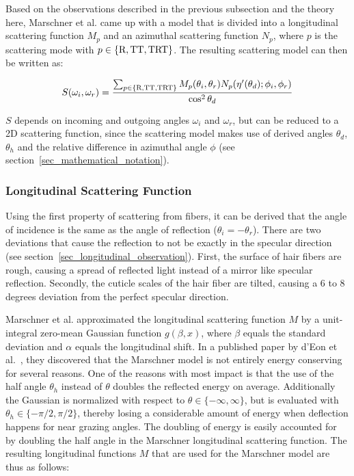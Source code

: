 \documentclass[11pt,a4paper]{report}
\begin{document}
Based on the observations described in the previous subsection and the theory here, Marschner et al. came up with a model that is divided into a longitudinal scattering function $M_p$ and an azimuthal scattering function $N_p$, where $p$ is the scattering mode with $p \in \{\textnormal{R}, \textnormal{TT}, \textnormal{TRT}\}$. The resulting scattering model can then be written as:

\begin{equation}
\label{marschner_model_scatterfunction}
S(\omega_i, \omega_r) = \frac{\sum_{p \in \{\textnormal{R}, \textnormal{TT}, \textnormal{TRT}\}} M_p(\theta_i, \theta_r) N_p(\eta'(\theta_d); \phi_i, \phi_r)}{\cos^2 \theta_d}
\end{equation}

$S$ depends on incoming and outgoing angles $\omega_i$ and $\omega_r$, but can be reduced to a 2D scattering function, since the scattering model makes use of derived angles $\theta_d$, $\theta_h$ and the relative difference in azimuthal angle $\phi$ (see section~\ref{sec_mathematical_notation}).

\subsubsection{Longitudinal Scattering Function}
\label{marschner_longitudinal_scattering_function}

Using the first property of scattering from fibers, it can be derived that the angle of incidence is the same as the angle of reflection ($\theta_i = -\theta_r$). There are two deviations that cause the reflection to not be exactly in the specular direction (see section~\ref{sec_longitudinal_observation}). First, the surface of hair fibers are rough, causing a spread of reflected light instead of a mirror like specular reflection. Secondly, the cuticle scales of the hair fiber are tilted, causing a 6 to 8 degrees deviation from the perfect specular direction.

Marschner et al. approximated the longitudinal scattering function $M$ by a unit-integral zero-mean Gaussian function $g(\beta, x)$, where $\beta$ equals the standard deviation and $\alpha$ equals the longitudinal shift. In a published paper by d'Eon et al.~\cite{eon2011}, they discovered that the Marschner model is not entirely energy conserving for several reasons. One of the reasons with most impact is that the use of the half angle $\theta_h$ instead of $\theta$ doubles the reflected energy on average. Additionally the Gaussian is normalized with respect to $\theta \in \{-\infty, \infty \}$, but is evaluated with $\theta_h \in \{ -\pi/2, \pi/2 \}$, thereby losing a considerable amount of energy when deflection happens for near grazing angles. The doubling of energy is easily accounted for by doubling the half angle in the Marschner longitudinal scattering function. The resulting longitudinal functions $M$ that are used for the Marschner model are thus as follows:
\end{document}

